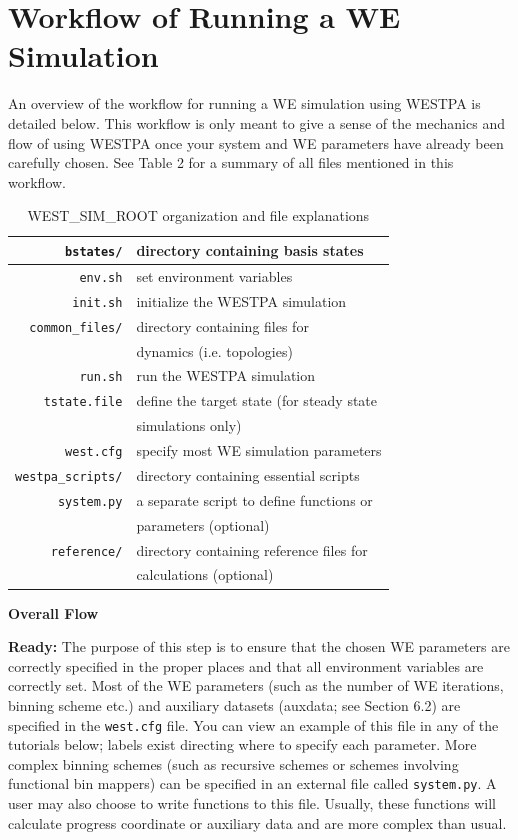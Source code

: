 \documentclass[9pt,tutorial,ASAPversion]{livecoms}
\begin{document}
\section{Workflow of Running a WE Simulation}

An overview of the workflow for running a WE simulation using WESTPA is detailed below. 
This workflow is only meant to give a sense of the mechanics and flow of using WESTPA once your system and WE parameters have already been carefully chosen. See Table 2 for a summary of all files mentioned in this workflow.

\begin{table}
\caption{WEST\_SIM\_ROOT organization and file explanations}
\centering
\begin{tabular}{| r | l |}
\hline
\verb|bstates/| & directory containing basis states \\
\hline
\verb|env.sh| & set environment variables \\
\hline
\verb|init.sh| & initialize the WESTPA simulation \\
\hline
\verb|common_files/| & directory containing files for \\
{} & dynamics (i.e. topologies) \\
\hline
\verb|run.sh| & run the WESTPA simulation \\
\hline
\verb|tstate.file| & define the target state (for steady state \\
{} & simulations only) \\
\hline
\verb|west.cfg| & specify most WE simulation parameters \\
\hline
\verb|westpa_scripts/| & directory containing essential scripts \\
\hline
\verb|system.py| & a separate script to define functions or \\
{} & parameters (optional) \\
\hline
\verb|reference/| & directory containing reference files for \\
{} & calculations (optional) \\
\hline
\end{tabular}
\end{table}

\textbf{Overall Flow}

\textbf{Ready:} The purpose of this step is to ensure that the chosen WE parameters are correctly specified in the proper places and that all environment variables are correctly set. 
Most of the WE parameters (such as the number of WE iterations, binning scheme etc.) and auxiliary datasets (auxdata; see Section 6.2) are specified in the \verb|west.cfg| file. 
You can view an example of this file in any of the tutorials below; labels exist directing where to specify each parameter. 
More complex binning schemes (such as recursive schemes or schemes involving functional bin mappers) can be specified in an external file called \verb|system.py|. 
A user may also choose to write functions to this file. 
Usually, these functions will calculate progress coordinate or auxiliary data and are more complex than usual.
\end{document}
